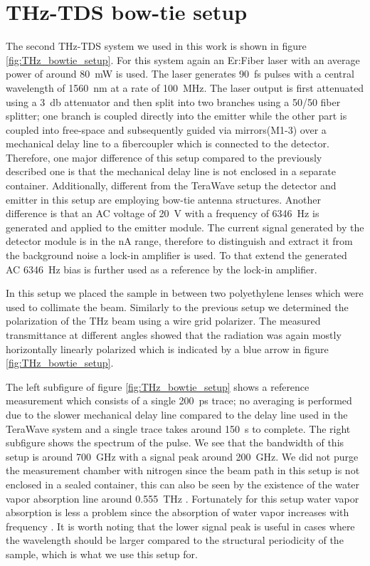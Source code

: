 \section{THz-TDS bow-tie setup}
The second THz-TDS system we used in this work is shown in figure \ref{fig:THz_bowtie_setup}. For this system again an Er:Fiber laser with an average power of around \SI{80}{\milli \watt} is used. The laser generates \SI{90}{\femto \second} pulses with a central wavelength of \SI{1560}{\nano \meter} at a rate of \SI{100}{\mega \hertz}. The laser output is first attenuated using a \SI{3}{\decibel} attenuator and then split into two branches using a 50/50 fiber splitter; one branch is coupled directly into the emitter while the other part is coupled into free-space and subsequently guided via mirrors(M1-3) over a mechanical delay line to a fibercoupler which is connected to the detector. Therefore, one major difference of this setup compared to the previously described one is that the mechanical delay line is not enclosed in a separate container. Additionally, different from the TeraWave setup the detector and emitter in this setup are employing bow-tie antenna structures. Another difference is that an AC voltage of \SI{20}{\volt} with a frequency of \SI{6346}{\hertz} is generated and applied to the emitter module. The current signal generated by the detector module is in the \si{\nano \ampere} range, therefore to distinguish and extract it from the background noise a lock-in amplifier is used. To that extend the generated AC \SI{6346}{\hertz} bias is further used as a reference by the lock-in amplifier.

In this setup we placed the sample in between two polyethylene lenses which were used to collimate the beam. Similarly to the previous setup we determined the polarization of the THz beam using a wire grid polarizer. The measured transmittance at different angles showed that the radiation was again mostly horizontally linearly polarized which is indicated by a blue arrow in figure \ref{fig:THz_bowtie_setup}. 

The left subfigure of figure \ref{fig:THz_bowtie_setup} shows a reference measurement which consists of a single \SI{200}{\pico \second} trace; no averaging is performed due to the slower mechanical delay line compared to the delay line used in the TeraWave system and a single trace takes around \SI{150}{\second} to complete. The right subfigure shows the spectrum of the pulse. We see that the bandwidth of this setup is around \SI{700}{\giga \hertz} with a signal peak around \SI{200}{\giga \hertz}. We did not purge the measurement chamber with nitrogen since the beam path in this setup is not enclosed in a sealed container, this can also be seen by the existence of the water vapor absorption line around \SI{0.555}{\tera \hertz} \cite{VanExter1989}. Fortunately for this setup water vapor absorption is less a problem since the absorption of water vapor increases with frequency \cite{Series2019}. It is worth noting that the lower signal peak is useful in cases where the wavelength should be larger compared to the structural periodicity of the sample, which is what we use this setup for. 

